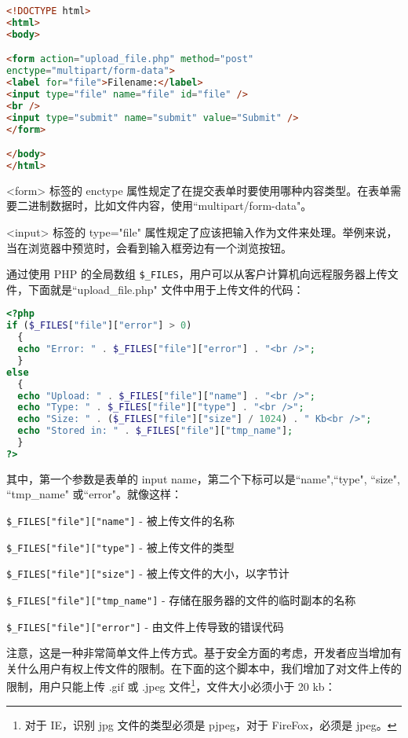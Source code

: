 \begin{lstlisting}[language=HTML]
<!DOCTYPE html>
<html>
<body>

<form action="upload_file.php" method="post"
enctype="multipart/form-data">
<label for="file">Filename:</label>
<input type="file" name="file" id="file" /> 
<br />
<input type="submit" name="submit" value="Submit" />
</form>

</body>
</html>
\end{lstlisting}

<form> 标签的 enctype 属性规定了在提交表单时要使用哪种内容类型。在表单需要二进制数据时，比如文件内容，使用``multipart/form-data"。

<input> 标签的 type="file" 属性规定了应该把输入作为文件来处理。举例来说，当在浏览器中预览时，会看到输入框旁边有一个浏览按钮。

通过使用 PHP 的全局数组 \texttt{\$\_FILES}，用户可以从客户计算机向远程服务器上传文件，下面就是``upload\_file.php" 文件中用于上传文件的代码：



\begin{lstlisting}[language=PHP]
<?php
if ($_FILES["file"]["error"] > 0)
  {
  echo "Error: " . $_FILES["file"]["error"] . "<br />";
  }
else
  {
  echo "Upload: " . $_FILES["file"]["name"] . "<br />";
  echo "Type: " . $_FILES["file"]["type"] . "<br />";
  echo "Size: " . ($_FILES["file"]["size"] / 1024) . " Kb<br />";
  echo "Stored in: " . $_FILES["file"]["tmp_name"];
  }
?>
\end{lstlisting}

其中，第一个参数是表单的 input name，第二个下标可以是``name",``type", ``size", ``tmp\_name" 或``error"。就像这样：

\begin{compactitem}
\item \texttt{\$\_FILES["file"]["name"]} - 被上传文件的名称
\item \texttt{\$\_FILES["file"]["type"]} - 被上传文件的类型
\item \texttt{\$\_FILES["file"]["size"]} - 被上传文件的大小，以字节计
\item \texttt{\$\_FILES["file"]["tmp\_name"]} - 存储在服务器的文件的临时副本的名称
\item \texttt{\$\_FILES["file"]["error"]} - 由文件上传导致的错误代码
\end{compactitem}

注意，这是一种非常简单文件上传方式。基于安全方面的考虑，开发者应当增加有关什么用户有权上传文件的限制。在下面的这个脚本中，我们增加了对文件上传的限制，用户只能上传 .gif 或 .jpeg 文件\footnote{对于 IE，识别 jpg 文件的类型必须是 pjpeg，对于 FireFox，必须是 jpeg。}，文件大小必须小于 20 kb：

